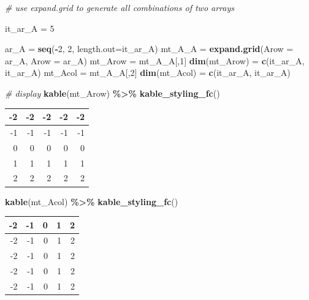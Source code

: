 \documentclass[
]{book}
\newenvironment{Shaded}{\begin{snugshade}}{\end{snugshade}}
\newcommand{\CommentTok}[1]{\textcolor[rgb]{0.56,0.35,0.01}{\textit{#1}}}
\newcommand{\DataTypeTok}[1]{\textcolor[rgb]{0.13,0.29,0.53}{#1}}
\newcommand{\DecValTok}[1]{\textcolor[rgb]{0.00,0.00,0.81}{#1}}
\newcommand{\KeywordTok}[1]{\textcolor[rgb]{0.13,0.29,0.53}{\textbf{#1}}}
\newcommand{\NormalTok}[1]{#1}
\newcommand{\OperatorTok}[1]{\textcolor[rgb]{0.81,0.36,0.00}{\textbf{#1}}}
\newcommand{\StringTok}[1]{\textcolor[rgb]{0.31,0.60,0.02}{#1}}
\begin{document}
\begin{Shaded}
\begin{Highlighting}[]
\CommentTok{\# use expand.grid to generate all combinations of two arrays}

\NormalTok{it\_ar\_A =}\StringTok{ }\DecValTok{5}

\NormalTok{ar\_A =}\StringTok{ }\KeywordTok{seq}\NormalTok{(}\OperatorTok{{-}}\DecValTok{2}\NormalTok{, }\DecValTok{2}\NormalTok{, }\DataTypeTok{length.out=}\NormalTok{it\_ar\_A)}
\NormalTok{mt\_A\_A =}\StringTok{ }\KeywordTok{expand.grid}\NormalTok{(}\DataTypeTok{Arow =}\NormalTok{ ar\_A, }\DataTypeTok{Arow =}\NormalTok{ ar\_A)}
\NormalTok{mt\_Arow =}\StringTok{ }\NormalTok{mt\_A\_A[,}\DecValTok{1}\NormalTok{]}
\KeywordTok{dim}\NormalTok{(mt\_Arow) =}\StringTok{ }\KeywordTok{c}\NormalTok{(it\_ar\_A, it\_ar\_A)}
\NormalTok{mt\_Acol =}\StringTok{ }\NormalTok{mt\_A\_A[,}\DecValTok{2}\NormalTok{]}
\KeywordTok{dim}\NormalTok{(mt\_Acol) =}\StringTok{ }\KeywordTok{c}\NormalTok{(it\_ar\_A, it\_ar\_A)}

\CommentTok{\# display}
\KeywordTok{kable}\NormalTok{(mt\_Arow) }\OperatorTok{\%\textgreater{}\%}
\StringTok{  }\KeywordTok{kable\_styling\_fc}\NormalTok{()}
\end{Highlighting}
\end{Shaded}

\begin{table}[!h]
\centering
\begin{tabular}{r|r|r|r|r}
\hline
-2 & -2 & -2 & -2 & -2\\
\hline
\rowcolor{gray!6}  -1 & -1 & -1 & -1 & -1\\
\hline
0 & 0 & 0 & 0 & 0\\
\hline
\rowcolor{gray!6}  1 & 1 & 1 & 1 & 1\\
\hline
2 & 2 & 2 & 2 & 2\\
\hline
\end{tabular}
\end{table}

\begin{Shaded}
\begin{Highlighting}[]
\KeywordTok{kable}\NormalTok{(mt\_Acol) }\OperatorTok{\%\textgreater{}\%}
\StringTok{  }\KeywordTok{kable\_styling\_fc}\NormalTok{()}
\end{Highlighting}
\end{Shaded}

\begin{table}[!h]
\centering
\begin{tabular}{r|r|r|r|r}
\hline
-2 & -1 & 0 & 1 & \vphantom{4} 2\\
\hline
\rowcolor{gray!6}  -2 & -1 & 0 & 1 & \vphantom{3} 2\\
\hline
-2 & -1 & 0 & 1 & \vphantom{2} 2\\
\hline
\rowcolor{gray!6}  -2 & -1 & 0 & 1 & \vphantom{1} 2\\
\hline
-2 & -1 & 0 & 1 & 2\\
\hline
\end{tabular}
\end{table}
\end{document}
